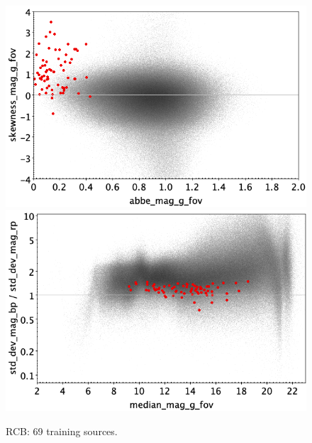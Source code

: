 \documentclass[longauth]{aa}
\begin{document}
\begin{appendix}
\begin{figure}
\vspace{4mm}
 \includegraphics[width=0.45\hsize]{figures/appendix/RCB_trn_ask.png}  %
\hspace{2mm}
 \includegraphics[width=0.45\hsize]{figures/appendix/RCB_trn_msdr.png}  \\ %
\vspace{4mm}
 \caption{RCB: 69 training sources.}  
 \label{fig:app:RCB_trn}
\end{figure}


\end{appendix}
\end{document}
